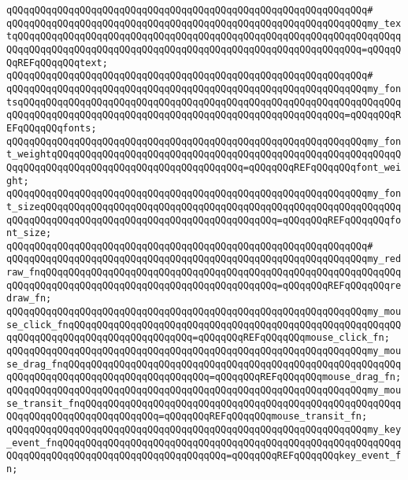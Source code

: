 \verb|qQQqqQQqqQQqqQQqqQQqqQQqqQQqqQQqqQQqqQQqqQQqqQQqqQQqqQQqqQQqqQQq#|\newline
\verb|qQQqqQQqqQQqqQQqqQQqqQQqqQQqqQQqqQQqqQQqqQQqqQQqqQQqqQQqqQQqqQQqmy_textqQQqqQQqqQQqqQQqqQQqqQQqqQQqqQQqqQQqqQQqqQQqqQQqqQQqqQQqqQQqqQQqqQQqqQQqqQQqqQQqqQQqqQQqqQQqqQQqqQQqqQQqqQQqqQQqqQQqqQQqqQQqqQQqqQQq=qQQqqQQqREFqQQqqQQqtext;|\newline
\verb|qQQqqQQqqQQqqQQqqQQqqQQqqQQqqQQqqQQqqQQqqQQqqQQqqQQqqQQqqQQqqQQq#|\newline
\verb|qQQqqQQqqQQqqQQqqQQqqQQqqQQqqQQqqQQqqQQqqQQqqQQqqQQqqQQqqQQqqQQqmy_fontsqQQqqQQqqQQqqQQqqQQqqQQqqQQqqQQqqQQqqQQqqQQqqQQqqQQqqQQqqQQqqQQqqQQqqQQqqQQqqQQqqQQqqQQqqQQqqQQqqQQqqQQqqQQqqQQqqQQqqQQqqQQqqQQq=qQQqqQQqREFqQQqqQQqfonts;|\newline
\verb|qQQqqQQqqQQqqQQqqQQqqQQqqQQqqQQqqQQqqQQqqQQqqQQqqQQqqQQqqQQqqQQqmy_font_weightqQQqqQQqqQQqqQQqqQQqqQQqqQQqqQQqqQQqqQQqqQQqqQQqqQQqqQQqqQQqqQQqqQQqqQQqqQQqqQQqqQQqqQQqqQQqqQQqqQQqqQQq=qQQqqQQqREFqQQqqQQqfont_weight;|\newline
\verb|qQQqqQQqqQQqqQQqqQQqqQQqqQQqqQQqqQQqqQQqqQQqqQQqqQQqqQQqqQQqqQQqmy_font_sizeqQQqqQQqqQQqqQQqqQQqqQQqqQQqqQQqqQQqqQQqqQQqqQQqqQQqqQQqqQQqqQQqqQQqqQQqqQQqqQQqqQQqqQQqqQQqqQQqqQQqqQQqqQQqqQQq=qQQqqQQqREFqQQqqQQqfont_size;|\newline
\verb|qQQqqQQqqQQqqQQqqQQqqQQqqQQqqQQqqQQqqQQqqQQqqQQqqQQqqQQqqQQqqQQq#|\newline
\verb|qQQqqQQqqQQqqQQqqQQqqQQqqQQqqQQqqQQqqQQqqQQqqQQqqQQqqQQqqQQqqQQqmy_redraw_fnqQQqqQQqqQQqqQQqqQQqqQQqqQQqqQQqqQQqqQQqqQQqqQQqqQQqqQQqqQQqqQQqqQQqqQQqqQQqqQQqqQQqqQQqqQQqqQQqqQQqqQQqqQQqqQQq=qQQqqQQqREFqQQqqQQqredraw_fn;|\newline
\verb|qQQqqQQqqQQqqQQqqQQqqQQqqQQqqQQqqQQqqQQqqQQqqQQqqQQqqQQqqQQqqQQqmy_mouse_click_fnqQQqqQQqqQQqqQQqqQQqqQQqqQQqqQQqqQQqqQQqqQQqqQQqqQQqqQQqqQQqqQQqqQQqqQQqqQQqqQQqqQQqqQQqqQQq=qQQqqQQqREFqQQqqQQqmouse_click_fn;|\newline
\verb|qQQqqQQqqQQqqQQqqQQqqQQqqQQqqQQqqQQqqQQqqQQqqQQqqQQqqQQqqQQqqQQqmy_mouse_drag_fnqQQqqQQqqQQqqQQqqQQqqQQqqQQqqQQqqQQqqQQqqQQqqQQqqQQqqQQqqQQqqQQqqQQqqQQqqQQqqQQqqQQqqQQqqQQqqQQq=qQQqqQQqREFqQQqqQQqmouse_drag_fn;|\newline
\verb|qQQqqQQqqQQqqQQqqQQqqQQqqQQqqQQqqQQqqQQqqQQqqQQqqQQqqQQqqQQqqQQqmy_mouse_transit_fnqQQqqQQqqQQqqQQqqQQqqQQqqQQqqQQqqQQqqQQqqQQqqQQqqQQqqQQqqQQqqQQqqQQqqQQqqQQqqQQqqQQq=qQQqqQQqREFqQQqqQQqmouse_transit_fn;|\newline
\verb|qQQqqQQqqQQqqQQqqQQqqQQqqQQqqQQqqQQqqQQqqQQqqQQqqQQqqQQqqQQqqQQqmy_key_event_fnqQQqqQQqqQQqqQQqqQQqqQQqqQQqqQQqqQQqqQQqqQQqqQQqqQQqqQQqqQQqqQQqqQQqqQQqqQQqqQQqqQQqqQQqqQQqqQQqqQQq=qQQqqQQqREFqQQqqQQqkey_event_fn;|\newline
